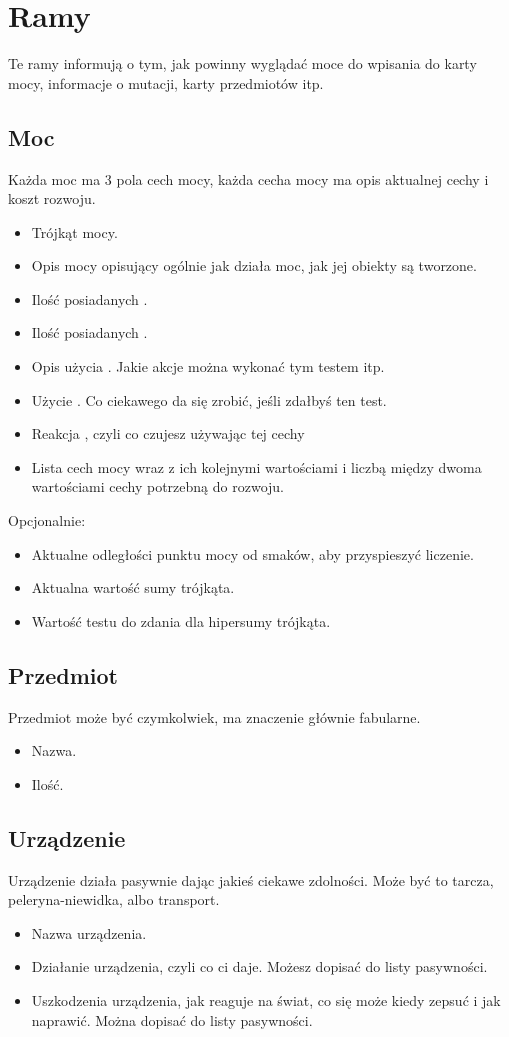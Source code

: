 \section{Ramy}
Te ramy informują o tym, jak powinny wyglądać moce do wpisania do karty mocy, informacje o mutacji, karty przedmiotów itp.

\subsection{Moc}
Każda moc ma 3 pola cech mocy, każda cecha mocy ma opis aktualnej cechy i koszt rozwoju.
\begin{itemize} 
	\item Trójkąt mocy.
	\item Opis mocy opisujący ogólnie jak działa moc, jak jej obiekty są tworzone.
	\item Ilość posiadanych \xpmcn{}.
	\item Ilość posiadanych \abkar{}.
	\item Opis użycia \absm{}. Jakie akcje można wykonać tym testem itp.
	\item Użycie \abdm{}. Co ciekawego da się zrobić, jeśli zdałbyś ten test.
	\item Reakcja \abrm{}, czyli co czujesz używając tej cechy
	\item Lista cech mocy wraz z ich kolejnymi wartościami i liczbą \xpmcn{} między dwoma wartościami cechy potrzebną do rozwoju.
\end{itemize}
Opcjonalnie:
\begin{itemize}
	\item Aktualne odległości punktu mocy od smaków, aby przyspieszyć liczenie.
	\item Aktualna wartość sumy trójkąta.
	\item Wartość testu do zdania dla hipersumy trójkąta.
\end{itemize}


\subsection{Przedmiot}
Przedmiot może być czymkolwiek, ma znaczenie głównie fabularne.
\begin{itemize}
 \item Nazwa.
 \item Ilość.
\end{itemize}

\subsection{Urządzenie}
Urządzenie działa pasywnie dając jakieś ciekawe zdolności.
Może być to tarcza, peleryna-niewidka, albo transport.
\begin{itemize}
\item Nazwa urządzenia.
\item Działanie urządzenia, czyli co ci daje. Możesz dopisać do listy pasywności.
\item Uszkodzenia urządzenia, jak reaguje na świat, co się może kiedy zepsuć i jak naprawić. Można dopisać do listy pasywności.
\end{itemize}

